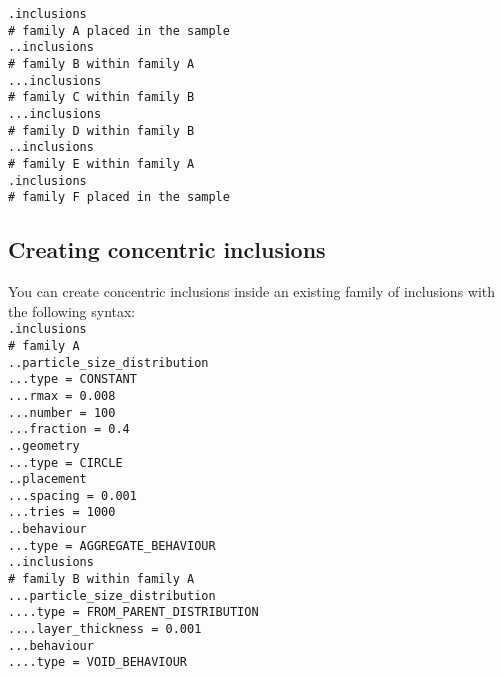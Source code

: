 \documentclass[10pt]{article}
\begin{document}
\noindent \verb+.inclusions+\\
\verb+# family A placed in the sample+\\
\verb+..inclusions+\\
\verb+# family B within family A+\\
\verb+...inclusions+\\
\verb+# family C within family B+\\
\verb+...inclusions+\\
\verb+# family D within family B+\\
\verb+..inclusions+\\
\verb+# family E within family A+\\
\verb+.inclusions+\\
\verb+# family F placed in the sample+

\subsection{Creating concentric inclusions}

You can create concentric inclusions inside an existing family of inclusions with the following syntax:\\

\noindent \verb+.inclusions+\\
\verb+# family A+\\
\verb+..particle_size_distribution+\\
\verb+...type = CONSTANT+\\
\verb+...rmax = 0.008+\\
\verb+...number = 100+\\
\verb+...fraction = 0.4+\\
\verb+..geometry+\\
\verb+...type = CIRCLE+\\
\verb+..placement+\\
\verb+...spacing = 0.001+\\
\verb+...tries = 1000+\\
\verb+..behaviour+\\
\verb+...type = AGGREGATE_BEHAVIOUR+\\
\verb+..inclusions+\\
\verb+# family B within family A+\\
\verb+...particle_size_distribution+\\
\verb+....type = FROM_PARENT_DISTRIBUTION+\\
\verb+....layer_thickness = 0.001+\\
\verb+...behaviour+\\
\verb+....type = VOID_BEHAVIOUR+
\end{document}
